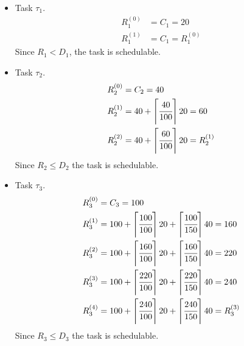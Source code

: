     {
        \begin{itemize}
            \item Task $\tau_1$.
            \begin{align*}
                R^{(0)}_1 &= C_1 = 20\\
                R^{(1)}_1 &= C_1 = R^{(0)}_1
            \end{align*}
            Since $R_1 < D_1$, the task is schedulable.
            \item Task $\tau_2$.
            \begin{align*}
                R^{(0)}_2 &= C_2 = 40\\
                R^{(1)}_2 &= 40 + \left\lceil \cfrac{40}{100} \right\rceil20 = 60\\
                R^{(2)}_2 &= 40 + \left\lceil \cfrac{60}{100} \right\rceil20 = R^{(1)}_2
            \end{align*}
            Since $R_2 \le D_2$ the task is schedulable.
            \item Task $\tau_3$.
            \begin{align*}
                R^{(0)}_3 &= C_3 = 100\\
                R^{(1)}_3 &= 100 + \left\lceil \cfrac{100}{100} \right\rceil20 + \left\lceil \cfrac{100}{150} \right\rceil40 = 160\\
                R^{(2)}_3 &= 100 + \left\lceil \cfrac{160}{100} \right\rceil20 + \left\lceil \cfrac{160}{150} \right\rceil40 = 220\\
                R^{(3)}_3 &= 100 + \left\lceil \cfrac{220}{100} \right\rceil20 + \left\lceil \cfrac{220}{150} \right\rceil40 = 240\\
                R^{(4)}_3 &= 100 + \left\lceil \cfrac{240}{100} \right\rceil20 + \left\lceil \cfrac{240}{150} \right\rceil40 = R^{(3)}_3
            \end{align*}
            Since $R_3 \le D_3$ the task is schedulable.
        \end{itemize}
        }


